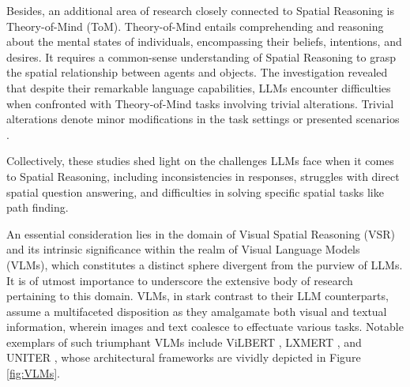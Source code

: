 \documentclass[twocolumn,11pt]{report}
\begin{document}
Besides, an additional area of research closely connected to Spatial Reasoning is Theory-of-Mind (ToM). Theory-of-Mind entails comprehending and reasoning about the mental states of individuals, encompassing their beliefs, intentions, and desires. It requires a common-sense understanding of Spatial Reasoning to grasp the spatial relationship between agents and objects. The investigation revealed that despite their remarkable language capabilities, LLMs encounter difficulties when confronted with Theory-of-Mind tasks involving trivial alterations. Trivial alterations denote minor modifications in the task settings or presented scenarios \cite{ullman2023large}.

Collectively, these studies shed light on the challenges LLMs face when it comes to Spatial Reasoning, including inconsistencies in responses, struggles with direct spatial question answering, and difficulties in solving specific spatial tasks like path finding. 

An essential consideration lies in the domain of Visual Spatial Reasoning (VSR) and its intrinsic significance within the realm of Visual Language Models (VLMs), which constitutes a distinct sphere divergent from the purview of LLMs. It is of utmost importance to underscore the extensive body of research pertaining to this domain. VLMs, in stark contrast to their LLM counterparts, assume a multifaceted disposition as they amalgamate both visual and textual information, wherein images and text coalesce to effectuate various tasks. Notable exemplars of such triumphant VLMs include ViLBERT \cite{li2019visualbert}, LXMERT \cite{tan2019lxmert}, and UNITER \cite{chen2020uniter}, whose architectural frameworks are vividly depicted in Figure \ref{fig:VLMs}.
\end{document}

